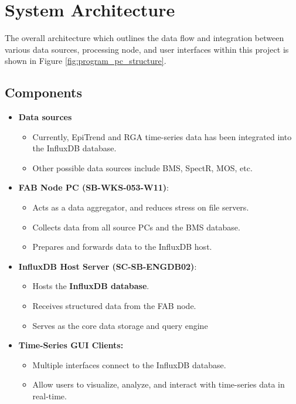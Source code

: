 \documentclass{article}
\begin{document}

\section{System Architecture}
The overall architecture which outlines the data flow and integration between various data sources, processing node, and user interfaces within this project is shown in Figure \ref{fig:program_pc_structure}.

\subsection{Components}
\begin{itemize}
    \item \textbf{Data sources}
    \begin{itemize}
        \item Currently, EpiTrend and RGA time-series data has been integrated into the InfluxDB database.

        \item Other possible data sources include BMS, SpectR, MOS, etc.
    \end{itemize}

    \item \textbf{FAB Node PC (SB-WKS-053-W11)}:
    \begin{itemize}
        \item Acts as a data aggregator, and reduces stress on file servers.

        \item Collects data from all source PCs and the BMS database.

        \item Prepares and forwards data to the InfluxDB host.
    \end{itemize}

    \item \textbf{InfluxDB Host Server (SC-SB-ENGDB02)}:
    \begin{itemize}
        \item Hosts the \textbf{InfluxDB database}.

        \item Receives structured data from the FAB node.

        \item Serves as the core data storage and query engine
    \end{itemize}

    \item \textbf{Time-Series GUI Clients:}
    \begin{itemize}
        \item Multiple interfaces connect to the InfluxDB database.

        \item Allow users to visualize, analyze, and interact with time-series data in real-time.
    \end{itemize}
    
\end{itemize}
\end{document}
